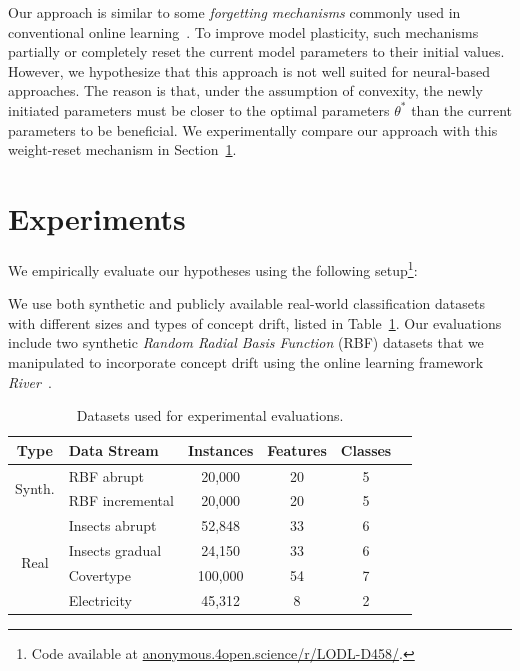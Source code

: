 \documentclass{article} %
\begin{document}
Our approach is similar to some \textit{forgetting mechanisms} commonly used in conventional online learning~\citep{gamaSurveyConceptDrift2014}.
To improve model plasticity, such mechanisms partially or completely reset the current model parameters to their initial values.
However, we hypothesize that this approach is not well suited for neural-based approaches.
The reason is that, under the assumption of convexity, the newly initiated parameters must be closer to the optimal parameters $\theta^*$ than the current parameters to be beneficial.
We experimentally compare our approach with this weight-reset mechanism in Section~\ref{sec:experiments}.

\section{Experiments}\label{sec:experiments}

We empirically evaluate our hypotheses using the following setup\footnote[2]{Code available at \url{anonymous.4open.science/r/LODL-D458/}.}:

We use both synthetic and publicly available real-world classification datasets with different sizes and types of concept drift, listed in Table~\ref{tab:datasets}.
Our evaluations include two synthetic \textit{Random Radial Basis Function} (RBF) datasets that we manipulated to incorporate concept drift using the online learning framework \textit{River}~\citep{montiel2021river}.

\begin{table}[ht]
   \centering
   \scriptsize
   \caption{Datasets used for experimental evaluations.}
   \begin{tabular}{@{}clcccc@{}}
      \toprule
      Type                    & Data Stream     & Instances               & Features & Classes \\
      \midrule
      \multirow{2}{*}{Synth.} & RBF abrupt      & 20,000                  & 20       & 5       \\
                              & RBF incremental & 20,000                  & 20       & 5       \\
      \midrule
      \multirow{5}{*}{Real}   & Insects abrupt  & 52,848                  & 33       & 6       \\
                              & Insects gradual & 24,150                  & 33       & 6       \\
                              & Covertype       & 100,000\footnotemark[3] & 54       & 7       \\
                              & Electricity     & 45,312                  & 8        & 2       \\
      \bottomrule
   \end{tabular}
   \label{tab:datasets}
\end{table}
\end{document}
